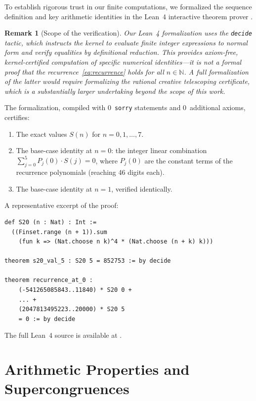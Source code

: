 \documentclass[11pt, a4paper]{article}
\newtheorem{remark}[theorem]{Remark}
\begin{document}
To establish rigorous trust in our finite computations, we formalized the sequence definition and key arithmetic identities in the Lean~4 interactive theorem prover \cite{deMoura2021}.

\begin{remark}[Scope of the verification]
Our Lean~4 formalization uses the \texttt{decide} tactic, which instructs the kernel to evaluate finite integer expressions to normal form and verify equalities by definitional reduction. This provides \emph{axiom-free, kernel-certified computation} of specific numerical identities---it is \emph{not} a formal proof that the recurrence~\eqref{eq:recurrence} holds for all $n \in \mathbb{N}$. A full formalization of the latter would require formalizing the rational creative telescoping certificate, which is a substantially larger undertaking beyond the scope of this work.
\end{remark}

The formalization, compiled with 0~\texttt{sorry} statements and 0~additional axioms, certifies:
\begin{enumerate}
    \item The exact values $S(n)$ for $n = 0, 1, \dots, 7$.
    \item The base-case identity at $n=0$: the integer linear combination $\sum_{j=0}^5 P_j(0) \cdot S(j) = 0$, where $P_j(0)$ are the constant terms of the recurrence polynomials (reaching 46 digits each).
    \item The base-case identity at $n=1$, verified identically.
\end{enumerate}

A representative excerpt of the proof:
\begin{verbatim}
def S20 (n : Nat) : Int :=
  ((Finset.range (n + 1)).sum
    (fun k => (Nat.choose n k)^4 * (Nat.choose (n + k) k)))

theorem s20_val_5 : S20 5 = 852753 := by decide

theorem recurrence_at_0 :
    (-541265085843..11840) * S20 0 +
    ... +
    (2047813495223..20000) * S20 5
    = 0 := by decide
\end{verbatim}
The full Lean~4 source is available at \cite{repo}.


\section{Arithmetic Properties and Supercongruences}\label{sec:numbertheory}
\end{document}
